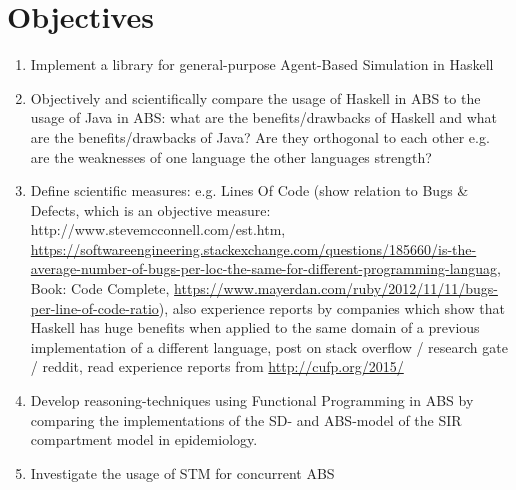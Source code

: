 \section{Objectives}
\begin{enumerate}
	\item Implement a library for general-purpose Agent-Based Simulation in Haskell 
	\item Objectively and scientifically compare the usage of Haskell in ABS to the usage of Java in ABS: what are the benefits/drawbacks of Haskell and what are the benefits/drawbacks of Java? Are they orthogonal to each other e.g. are the weaknesses of one language the other languages strength?
	\item Define scientific measures: e.g. Lines Of Code (show relation to Bugs \& Defects, which is an objective measure: http://www.stevemcconnell.com/est.htm, \url{https://softwareengineering.stackexchange.com/questions/185660/is-the-average-number-of-bugs-per-loc-the-same-for-different-programming-languag}, Book: Code Complete, \url{https://www.mayerdan.com/ruby/2012/11/11/bugs-per-line-of-code-ratio}), also experience reports by companies which show that Haskell has huge benefits when applied to the same domain of a previous implementation of a different language, post on stack overflow / research gate / reddit, read experience reports from \url{http://cufp.org/2015/}
	\item Develop reasoning-techniques using Functional Programming in ABS by comparing the implementations of the SD- and ABS-model of the SIR compartment model in epidemiology.
	\item Investigate the usage of STM for concurrent ABS
\end{enumerate}

